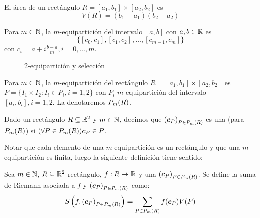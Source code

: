 El \'area de un rect\'angulo $ R = [a_1, b_1] \times [a_2, b_2] $ es
\[ V(R) = (b_1-a_1)(b_2-a_2) \]

\begin{definicion}
Para $m\in \mathbb{N}$, la $m$-equipartici\'on del intervalo $ [a, b] $ con $ a,b \in \mathbb{R} $ es 
$$ \bigl\{[c_0, c_1], [c_1, c_2], \ldots,
[c_{m-1}, c_m]\bigr\} $$ 
con $ c_i = a + i\frac{b-a}{m}, i=0,
\ldots, m$. 
\end{definicion}

\begin{figure}[H]
	\centering
	
	\caption{2-equipartici\'on y selecci\'on}
\end{figure}

\begin{definicion}
Para $m\in \mathbb{N}$, la $m$-equipartici\'on del rect\'angulo $ R = [a_1, b_1] \times [a_2, b_2] $ es $ P = \{I_1 \times I_2 : I_i \in P_i, i=1, 2 \} $ con $ P_i $ $m$-equipartici\'on del intervalo $ [a_i, b_i] , i=1, 2 $. La denotaremos $ P_{m}(R)$.
\end{definicion}

\begin{definicion}
Dado un rect\'angulo $ R \subseteq \mathbb{R}^2 $ y $m\in \mathbb{N}$, decimos que $ {(\boldsymbol{c}_P)}_{P \in P_{m}(R)} $ es una \familiaEleccion{} (para $P_{m}(R)$) si $(\forall P \in P_{m}(R)) \boldsymbol{c}_P \in P$.
\end{definicion}

Notar que cada elemento de una $m$-equipartici\'on es un rect\'angulo y que una $m$-equipartici\'on es finita, luego la siguiente definici\'on tiene sentido:


\begin{definicion}
Sea $m\in \mathbb{N}$, $ R \subseteq \mathbb{R}^2 $ rect\'angulo, $ f:R \to \mathbb{R}$ y una \familiaEleccion{} $ {(\boldsymbol{c}_P)}_{P \in P_{m}(R)} $. Se define la suma de Riemann  asociada a $ f $ y ${(\boldsymbol{c}_P)}_{P \in P_{m}(R)} $ como:
\[S\left(f, {(\boldsymbol{c}_P)}_{P \in P_{m}(R)}\right) = \sum_{P \in P_{m}(R)} f(\boldsymbol{c}_P) V(P) \]
\end{definicion}

